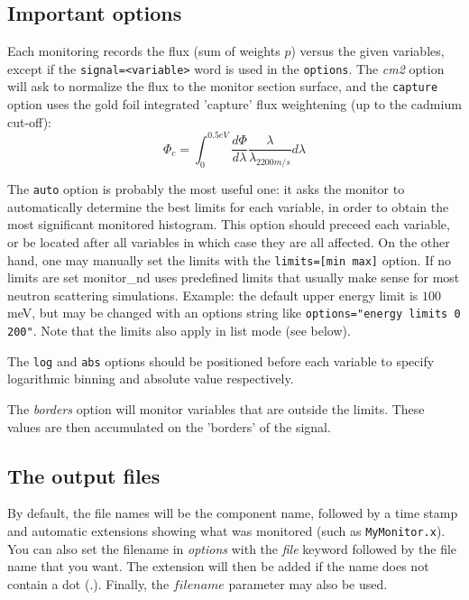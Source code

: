 \subsection{Important options}

Each monitoring records the flux (sum of weights $p$) versus the
given variables, except if the \verb+signal=<variable>+ word is used in the \verb+options+.
The \textit{cm2} option will ask to normalize the flux to the monitor section surface, and the \verb+capture+ option uses the gold foil integrated 'capture' flux weightening (up to the cadmium cut-off):
\begin{equation}
\Phi_c = \int_0^{0.5 eV}{\frac{d\Phi}{d\lambda} \frac{\lambda}{\lambda_{2200 m/s}} d\lambda}
\end{equation}

The \verb+auto+ option is probably the most useful one: it asks the monitor to automatically determine the best limits for each variable, in order to obtain the most significant monitored histogram. This option should preceed each variable, or be located after all variables in which case they are all affected.
On the other hand, one may manually set the limits with the \verb+limits=[min max]+ option.
If no limits are set monitor\_nd uses predefined limits that usually make sense for most neutron scattering simulations. Example: the default upper energy limit is $100$ meV, but may be changed with an options string like
\verb+options="energy limits 0 200"+. Note that the limits also apply in list mode (see below).

The \verb+log+ and \verb+abs+ options should be positioned before each variable to specify logarithmic binning and absolute value respectively.

The \textit{borders} option will monitor variables that are outside
the limits. These values are then accumulated on the 'borders' of the
signal.

\subsection{The output files}

By default, the file names will be the component name, followed by a time stamp and
automatic extensions showing what was monitored (such as
\texttt{MyMonitor.x}). You can also set the filename in \textit{options}
with the \textit{file} keyword followed by the file name that you want. The
extension will then be added if the name does not contain a dot (.).
Finally, the $filename$ parameter may also be used.


